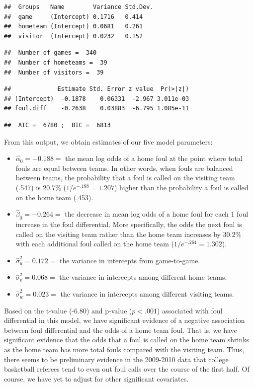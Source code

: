 \documentclass[
]{krantz}
\providecommand{\tightlist}{%
  \setlength{\itemsep}{0pt}\setlength{\parskip}{0pt}}
\begin{document}
\begin{verbatim}
##  Groups   Name        Variance Std.Dev.
##  game     (Intercept) 0.1716   0.414   
##  hometeam (Intercept) 0.0681   0.261   
##  visitor  (Intercept) 0.0232   0.152
\end{verbatim}

\begin{verbatim}
##  Number of games =  340 
##  Number of hometeams =  39 
##  Number of visitors =  39
\end{verbatim}

\begin{verbatim}
##             Estimate Std. Error z value  Pr(>|z|)
## (Intercept)  -0.1878    0.06331  -2.967 3.011e-03
## foul.diff    -0.2638    0.03883  -6.795 1.085e-11
\end{verbatim}

\begin{verbatim}
##  AIC =  6780 ;  BIC =  6813
\end{verbatim}

From this output, we obtain estimates of our five model parameters:

\begin{itemize}
\tightlist
\item
  \(\hat{\alpha}_{0}=-0.188=\) the mean log odds of a home foul at the point where total fouls are equal between teams. In other words, when fouls are balanced between teams, the probability that a foul is called on the visiting team (.547) is 20.7\% (\(1/e^{-.188}=1.207\)) higher than the probability a foul is called on the home team (.453).
\item
  \(\hat{\beta}_{0}=-0.264=\) the decrease in mean log odds of a home foul for each 1 foul increase in the foul differential. More specifically, the odds the next foul is called on the visiting team rather than the home team increases by 30.2\% with each additional foul called on the home team (\(1/e^{-.264}=1.302\)).
\item
  \(\hat{\sigma}_{u}^{2}=0.172=\) the variance in intercepts from game-to-game.
\item
  \(\hat{\sigma}_{v}^{2}=0.068=\) the variance in intercepts among different home teams.
\item
  \(\hat{\sigma}_{w}^{2}=0.023=\) the variance in intercepts among different visiting teams.
\end{itemize}

Based on the t-value (-6.80) and p-value (\(p<.001\)) associated with foul differential in this model, we have significant evidence of a negative association between foul differential and the odds of a home team foul. That is, we have significant evidence that the odds that a foul is called on the home team shrinks as the home team has more total fouls compared with the visiting team. Thus, there seems to be preliminary evidence in the 2009-2010 data that college basketball referees tend to even out foul calls over the course of the first half. Of course, we have yet to adjust for other significant covariates.
\end{document}
